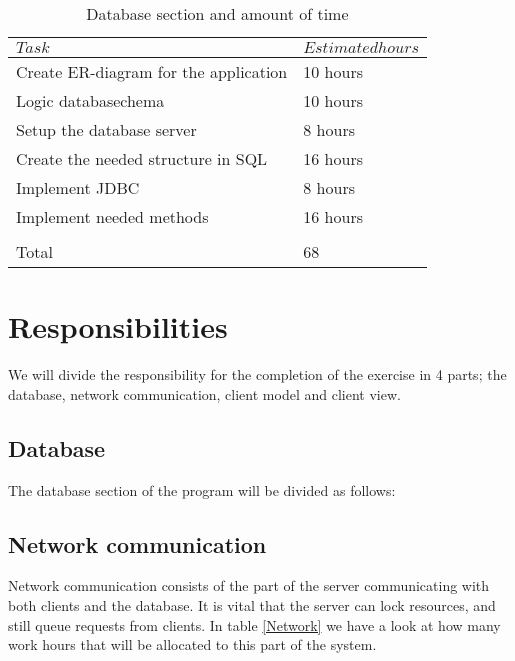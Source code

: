 \documentclass[a4paper, english, 12pt]{article}
\begin{document}
\begin{table}[h]
    \begin{center}
    \caption{Database section and amount of time} 
    \label{database}
    \vspace{0,5cm}
    \begin{tabular}{ll} \\ 
        \hline
        $Task$ & $Estimated hours$\\
        \hline 
    Create ER-diagram for the application & 10 hours\\
    Logic databasechema & 10 hours\\    
    Setup the database server & 8 hours\\
    Create the needed structure in SQL & 16 hours\\
    Implement JDBC & 8 hours\\
    Implement needed methods & 16 hours\\
	\hline \\
	Total & 68
        \hline
    \end{tabular}
    \end{center}
\end{table}

\section{Responsibilities}
We will divide the responsibility for the completion of the exercise in 4 parts; the database, network communication, 
client model and client view. 
\subsection{Database}
The database section of the program will be divided as follows:



\subsection{Network communication}
Network communication consists of the part of the server communicating with both clients and the database. It is vital that the server can lock resources, and still queue requests from clients. In table \ref{Network} we have a look at how many work hours that will be allocated to this part of the system.
\end{document}
